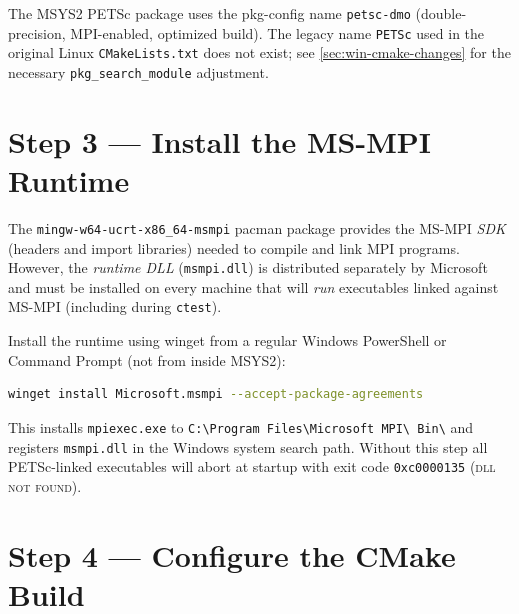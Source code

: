 \begin{remark}
The MSYS2 PETSc package uses the pkg-config name \texttt{petsc-dmo}
(double-precision, MPI-enabled, optimized build).  The legacy name
\texttt{PETSc} used in the original Linux \texttt{CMakeLists.txt} does not
exist; see \autoref{sec:win-cmake-changes} for the necessary
\texttt{pkg\_search\_module} adjustment.
\end{remark}

\section{Step 3 — Install the MS-MPI Runtime}
\label{sec:win-msmpi-runtime}

The \texttt{mingw-w64-ucrt-x86\_64-msmpi} pacman package provides the
MS-MPI \emph{SDK} (headers and import libraries) needed to compile and link
MPI programs.  However, the \emph{runtime DLL} (\texttt{msmpi.dll}) is
distributed separately by Microsoft and must be installed on every machine
that will \emph{run} executables linked against MS-MPI (including during
\texttt{ctest}).

Install the runtime using winget from a regular Windows PowerShell or Command
Prompt (not from inside MSYS2):

\begin{lstlisting}[language=bash, basicstyle=\ttfamily\small,
    keywordstyle=\bfseries\color{blue!70!black},
    commentstyle=\itshape\color{green!50!black},
    stringstyle=\color{red!60!black},
    frame=single, framerule=0.4pt, rulecolor=\color{gray!50},
    breaklines=true, showstringspaces=false]
winget install Microsoft.msmpi --accept-package-agreements
\end{lstlisting}

This installs \texttt{mpiexec.exe} to
\texttt{C:\textbackslash Program Files\textbackslash Microsoft MPI\textbackslash
Bin\textbackslash} and registers \texttt{msmpi.dll} in the Windows system
search path.  Without this step all PETSc-linked executables will abort at
startup with exit code \texttt{0xc0000135} (\textsc{dll not found}).

\section{Step 4 — Configure the CMake Build}
\label{sec:win-cmake-invoke}

